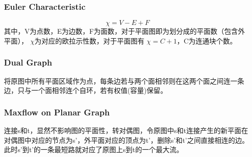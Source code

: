 \subsubsection{Euler Characteristic}
$$ \chi = V-E+F $$
其中，V为点数，E为边数，F为面数，对于平面图即为划分成的平面数（包含外平面），
$ \chi $为对应的欧拉示性数，对于平面图有 $ \chi = C + 1 $，C为连通块个数。

\subsubsection{Dual Graph}
将原图中所有平面区域作为点，每条边若与两个面相邻则在这两个面之间连一条边，只与一个面相邻连个自环，若有权值(容量)保留。

\subsubsection{Maxflow on Planar Graph}
连接s和t，显然不影响图的平面性，转对偶图，令原图中s和t连接产生的新平面在对偶图中对应的节点为s'，外平面对应的顶点为t'，删除s'和t'之间直接相连的边。
此时s'到t'的一条最短路就对应了原图上s到t的一个最大流。
